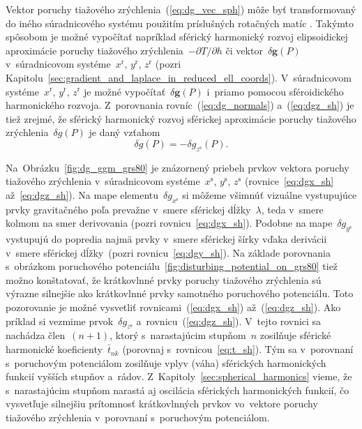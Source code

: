 \documentclass[a4paper,12pt]{book}
\let\vec\mathbf
\begin{document}
Vektor poruchy tiažového zrýchlenia~(\ref{eq:dg_vec_sph}) môže byť 
transformovaný do iného súradnicového systému použitím príslušných rotačných 
matíc \parencite[pozri napríklad][]{WGS84}.  Takýmto spôsobom je možné 
vypočítať napríklad sférický harmonický rozvoj elipsoidickej aproximácie 
poruchy tiažového zrýchlenia~$-\partial T \slash \partial h$ či vektor~$\delta 
\vec g(P)$ v~súradnicovom systéme~$x^\mathrm{r}$, $y^\mathrm{r}$, 
$z^\mathrm{r}$ (pozri 
Kapitolu~\ref{sec:gradient_and_laplace_in_reduced_ell_coords}).  V~súradnicovom 
systéme~$x^\mathrm{r}$, $y^\mathrm{r}$, $z^\mathrm{r}$ je možné 
vypočítať~$\delta \vec g(P)$ i~priamo pomocou sféroidického harmonického 
rozvoja.  Z~porovnania rovníc~(\ref{eq:dg_normals}) a~(\ref{eq:dgz_sh}) je tiež 
zrejmé, že sférický harmonický rozvoj sférickej aproximácie poruchy tiažového 
zrýchlenia~$\delta g(P)$ je daný vzťahom
%
\begin{equation}
\label{eq:dg_sh_sa}
\delta g(P) = -\delta g_{z^\mathrm{s}}(P){.}
\end{equation}

Na~Obrázku~\ref{fig:dg_ggm_grs80} je znázornený priebeh prvkov vektora poruchy 
tiažového zrýchlenia v~súradnicovom systéme~$x^\mathrm{s}$, $y^\mathrm{s}$, 
$z^\mathrm{s}$ (rovnice~\ref{eq:dgx_sh} až~\ref{eq:dgz_sh}).  Na mape 
elementu~$\delta g_{x^\mathrm{s}}$ si môžeme všimnúť vizuálne vystupujúce prvky 
gravitačného poľa prevažne v~smere sférickej dĺžky~$\lambda$, teda v~smere 
kolmom na smer derivovania (pozri rovnicu~\ref{eq:dgx_sh}).  Podobne na 
mape~$\delta g_{y^\mathrm{s}}$ vystupujú do popredia najmä prvky v~smere 
sférickej šírky vďaka derivácii v~smere sférickej dĺžky~(pozri 
rovnicu~\ref{eq:dgy_sh}).  Na základe porovnania s~obrázkom poruchového 
potenciálu~\ref{fig:disturbing_potential_on_grs80} tiež možno konštatovať, že 
krátkovlnné prvky poruchy tiažového zrýchlenia sú výrazne silnejšie ako 
krátkovlnné prvky samotného poruchového potenciálu.  Toto pozorovanie je možné 
vysvetliť rovnicami~(\ref{eq:dgx_sh}) až~(\ref{eq:dgz_sh}).  Ako príklad si 
vezmime prvok~$\delta g_{z^\mathrm{s}}$ a~rovnicu~(\ref{eq:dgz_sh}).  V~tejto 
rovnici sa nachádza člen~$(n + 1)$, ktorý s~narastajúcim stupňom~$n$ zosilňuje 
sférické harmonické koeficienty~$\bar{t}_{nk}$ (porovnaj 
s~rovnicou~\ref{eq:t_sh}).  Tým sa v~porovnaní s~poruchovým potenciálom 
zosilňuje vplyv (váha) sférických harmonických funkcií vyšších stupňov a~rádov.  
Z~Kapitoly~\ref{sec:spherical_harmonics} vieme, že s~narastajúcim stupňom 
narastá aj oscilácia sférických harmonických funkcií, čo vysvetľuje silnejšiu 
prítomnosť krátkovlnných prvkov vo~vektore poruchy tiažového zrýchlenia 
v~porovnaní s~poruchovým potenciálom.
\end{document}
